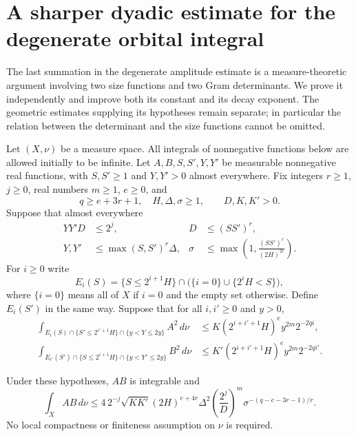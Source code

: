 \section{A sharper dyadic estimate for the degenerate orbital integral}
\label{ods-section}

The last summation in the degenerate amplitude estimate is a
measure-theoretic argument involving two size functions and two
Gram determinants. We prove it independently and improve both its
constant and its decay exponent. The geometric estimates supplying
its hypotheses remain separate; in particular the relation between
the determinant and the size functions cannot be omitted.
\cite{alpo-uniform-source}

Let $(X,\nu)$ be a measure space. All integrals of nonnegative
functions below are allowed initially to be infinite. Let
$A,B,S,S',Y,Y'$ be measurable nonnegative real functions, with
$S,S'\ge1$ and $Y,Y'>0$ almost everywhere. Fix integers
$r\ge1$, $j\ge0$, real numbers $m\ge1$, $e\ge0$, and
\[
 q\ge e+3r+1,\quad H,\Delta,\sigma\ge1,
 \qquad D,K,K'>0.
                                                               \tag{OD1}
\]
Suppose that almost everywhere
\begin{align}
 YY'D&\le2^j,& D&\le(SS')^r,\nonumber\\
 Y,Y'&\le\max(S,S')^r\Delta,&
 \sigma&\le\max\left(1,\frac{(SS')^r}{(2H)^{2r}}\right).
                                                               \tag{OD2}
\end{align}
For $i\ge0$ write
\[
 E_i(S)=\{S\le2^{i+1}H\}\cap
       \bigl(\{i=0\}\cup\{2^iH<S\}\bigr),
\]
where $\{i=0\}$ means all of $X$ if $i=0$ and the empty set
otherwise. Define $E_i(S')$ in the same way. Suppose that for all
$i,i'\ge0$ and $y>0$,
\begin{align}
 \int_{E_i(S)\cap\{S'\le2^{i'+1}H\}\cap\{y<Y\le2y\}}
                    A^2\,d\nu
 &\le K(2^{i+i'+1}H)^e y^{2m}2^{-2qi},\label{ods-first}\\
 \int_{E_{i'}(S')\cap\{S\le2^{i+1}H\}\cap\{y<Y'\le2y\}}
                    B^2\,d\nu
 &\le K'(2^{i+i'+1}H)^e y^{2m}2^{-2qi'}.
                                                               \label{ods-second}
\end{align}

\begin{theorem}\label{ods-dyadic}
Under these hypotheses, $AB$ is integrable and
\begin{equation}\label{ods-bound}
 \int_X AB\,d\nu
 \le 4\,2^{-j}\sqrt{KK'}(2H)^{e+4r}\Delta^2
        \left(\frac{2^j}{D}\right)^m
        \sigma^{-(q-e-3r-1)/r}.
\end{equation}
No local compactness or finiteness assumption on $\nu$ is required.
\end{theorem}

